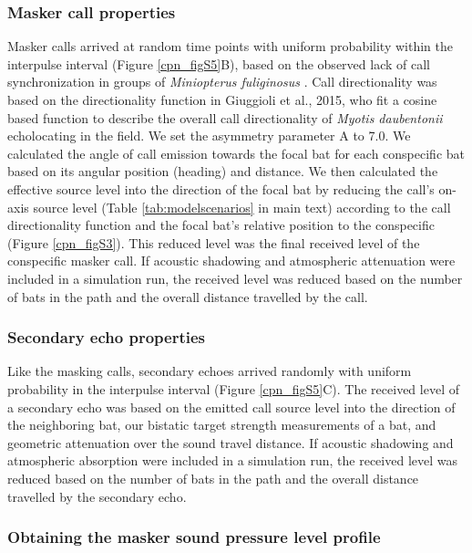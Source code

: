 \documentclass[
]{book}
\begin{document}
\hypertarget{masker-call-properties}{%
\subsubsection{Masker call properties}\label{masker-call-properties}}

Masker calls arrived at random time points with uniform probability within the
interpulse interval (Figure \ref{cpn_figS5}B), based on the observed lack of call synchronization in groups of \emph{Miniopterus fuliginosus} \citep{hase2018a}. Call directionality was based on the directionality function in Giuggioli et al., 2015, who fit a cosine based function to describe the overall call directionality of \emph{Myotis daubentonii} echolocating in the field. We set the asymmetry parameter A to 7.0. We calculated the angle of call emission towards the focal bat for each conspecific bat based on its angular position (heading) and distance. We then calculated the effective source level into the direction of the focal bat by reducing the call's on-axis source level (Table \ref{tab:modelscenarios} in main text) according to the call directionality function and the focal bat's relative position to the conspecific (Figure \ref{cpn_figS3}). This reduced level was the final received level of the conspecific masker call. If acoustic shadowing and atmospheric attenuation were included in a simulation run, the received level was reduced based on the number of bats in the path and the overall distance travelled by the call.

\hypertarget{secondary-echo-properties}{%
\subsubsection{Secondary echo properties}\label{secondary-echo-properties}}

Like the masking calls, secondary echoes arrived randomly with uniform probability in the interpulse interval (Figure \ref{cpn_figS5}C). The received level of a secondary echo was based on the emitted call source level into the direction of the neighboring bat, our bistatic target strength measurements of a bat, and geometric attenuation over the sound travel distance. If acoustic shadowing and atmospheric absorption were included in a simulation run, the received level was reduced based on the number of bats in the path and the overall distance travelled by the secondary echo.

\hypertarget{obtaining-the-masker-sound-pressure-level-profile}{%
\subsubsection{Obtaining the masker sound pressure level profile}\label{obtaining-the-masker-sound-pressure-level-profile}}
\end{document}
